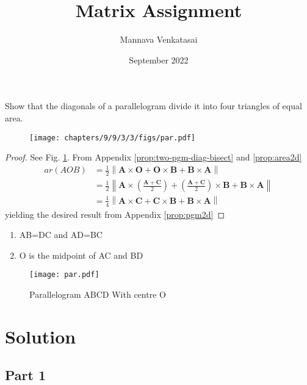 \documentclass[journal,10pt,twocolumn]{article}
\title{\textbf{Matrix Assignment}}
\author{Mannava Venkatasai}
\date{September 2022}
\providecommand{\norm}[1]{\left\lVert#1\right\rVert}
\let\vec\mathbf
\providecommand{\brak}[1]{\ensuremath{\left(#1\right)}}
\begin{document}
\maketitle
\fi
 Show that the diagonals of a parallelogram divide
it into four triangles of equal area.
	\begin{figure}[H]
		\centering
 \texttt{[image: chapters/9/9/3/3/figs/par.pdf]}
		\caption{}
		\label{fig:9/9/3/3}
  	\end{figure}
\begin{proof}
	See Fig. 
		\ref{fig:9/9/3/3}.
	From Appendix
	  \ref{prop:two-pgm-diag-bisect} and 
  \ref{prop:area2d}
\begin{align}
	ar\brak{AOB} &= 
	\frac{1}{2} \norm{\vec{A} \times \vec{O}+\vec{O} \times \vec{B}+\vec{B} \times \vec{A}}
	\\
	&=	\frac{1}{2} \norm{\vec{A} \times \brak{\frac{\vec{A}+\vec{C}}{2}}+\brak{\frac{\vec{A}+\vec{C}}{2}} \times \vec{B}+\vec{B} \times \vec{A}}
	\\
	&=\frac{1}{4} \norm{\vec{A} \times \vec{C}+\vec{C} \times \vec{B}+\vec{B} \times \vec{A}}
  \end{align}
  yielding the desired result from Appendix
  \ref{prop:pgm2d}
\end{proof}
\iffalse
\begin{enumerate}
	\item AB=DC and AD=BC
	\item O is the midpoint of AC and BD
\end{enumerate}
\begin{figure}[H]
\centering
\texttt{[image: par.pdf]}
\caption{Parallelogram ABCD With centre O}
\label{fig:Parallelogram}
\end{figure}

\section*{Solution}
\subsection*{Part 1}
\end{document}
